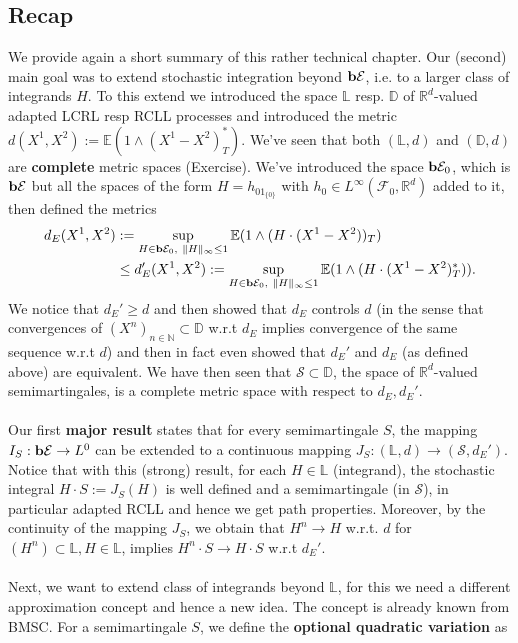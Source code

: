 \documentclass[12pt,a4paper, twoside]{article}
\theoremstyle{definition}
\newcommand{\EE}{\mathbb{E}} %
\newcommand{\simple}{\textbf{\text{b}}\mathcal{E}}
\begin{document}
\subsection{Recap} We provide again a short summary of this rather technical chapter. Our (second) main goal was to extend stochastic integration beyond $\simple$, i.e. to a larger class of integrands $H$. To this extend we introduced the space $\mathbb{L}$ resp. $\mathbb{D}$ of $\mathbb{R}^d$-valued adapted LCRL resp RCLL processes and introduced the metric $d(X^1,X^2):= \EE(1 \wedge (X^1-X^2)_T^*).$ We've seen that both $(\mathbb{L},d)$ and $( \mathbb{D}, d)$ are \textbf{complete} metric spaces (Exercise). We've introduced the space $\simple_0$, which is $\simple$ but all the spaces of the form $H=h_01_{\{0\}}$ with $h_0 \in L^\infty ( \mathcal{F}_0, \mathbb{R}^d)$ added to it, then defined the metrics
\begin{align*}
d_E(X^1,X^2)&:= \sup_{H \in \simple_0, \ \|H\|_\infty \leq 1} \EE(1 \wedge (H \cdot (X^1-X^2))_T) \\
& \leq d_E'(X^1,X^2):= \sup_{H \in \simple_0, \ \|H\|_\infty \leq 1} \EE(1 \wedge (H \cdot (X^1-X^2)_T^*)).
\end{align*}
We notice that $d_E' \geq d$ and then showed that $d_E$ controls $d$ (in the sense that convergences of $(X^n)_{n \in \mathbb{N}} \subset \mathbb{D}$ w.r.t $d_E$ implies convergence of the same sequence w.r.t $d$) and then in fact even showed that $d_E'$ and $d_E$ (as defined above) are equivalent. We have then seen that $\mathcal{S} \subset \mathbb{D}$, the space of $\mathbb{R}^d$-valued semimartingales, is a complete metric space with respect to $d_E,d_E'$.
\\\\
Our first \textbf{major result} states that for every semimartingale $S$, the mapping $I_S: \simple \to L^0$ can be extended to a continuous mapping $J_S: ( \mathbb{L},d) \to ( \mathcal{S}, d_E')$. Notice that with this (strong) result, for each $H \in \mathbb{L}$ (integrand), the stochastic integral $H \cdot S := J_S(H)$ is well defined and a semimartingale (in $\mathcal{S}$), in particular adapted RCLL and hence we get path properties. Moreover, by the continuity of the mapping $J_S$, we obtain that $H^n \to H$ w.r.t. $d$ for $(H^n) \subset \mathbb{L}, H \in \mathbb{L}$, implies $H^n \cdot S \to H \cdot S$ w.r.t $d_E'$. 
\\\\
Next, we want to extend class of integrands beyond $\mathbb{L}$, for this we need a different approximation concept and hence a new idea. The concept is already known from BMSC. For a semimartingale $S$, we define the \textbf{optional quadratic variation} as
\end{document}
